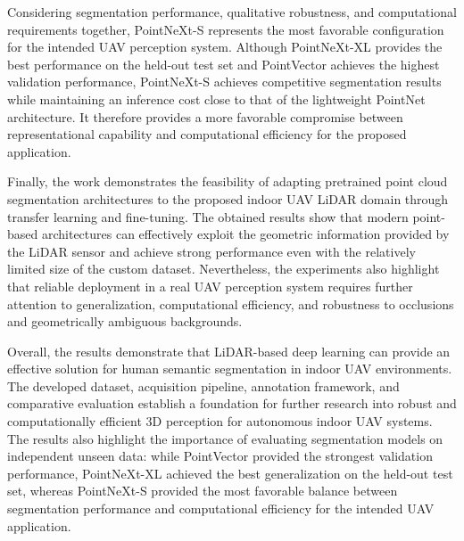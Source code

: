 Considering segmentation performance, qualitative robustness, and computational requirements together, PointNeXt-S represents the most favorable configuration for the intended UAV perception system. Although PointNeXt-XL provides the best performance on the held-out test set and PointVector achieves the highest validation performance, PointNeXt-S achieves competitive segmentation results while maintaining an inference cost close to that of the lightweight PointNet architecture. It therefore provides a more favorable compromise between representational capability and computational efficiency for the proposed application.

Finally, the work demonstrates the feasibility of adapting pretrained point cloud segmentation architectures to the proposed indoor UAV LiDAR domain through transfer learning and fine-tuning. The obtained results show that modern point-based architectures can effectively exploit the geometric information provided by the LiDAR sensor and achieve strong performance even with the relatively limited size of the custom dataset. Nevertheless, the experiments also highlight that reliable deployment in a real UAV perception system requires further attention to generalization, computational efficiency, and robustness to occlusions and geometrically ambiguous backgrounds.

Overall, the results demonstrate that LiDAR-based deep learning can provide an effective solution for human semantic segmentation in indoor UAV environments. The developed dataset, acquisition pipeline, annotation framework, and comparative evaluation establish a foundation for further research into robust and computationally efficient 3D perception for autonomous indoor UAV systems. The results also highlight the importance of evaluating segmentation models on independent unseen data: while PointVector provided the strongest validation performance, PointNeXt-XL achieved the best generalization on the held-out test set, whereas PointNeXt-S provided the most favorable balance between segmentation performance and computational efficiency for the intended UAV application.

